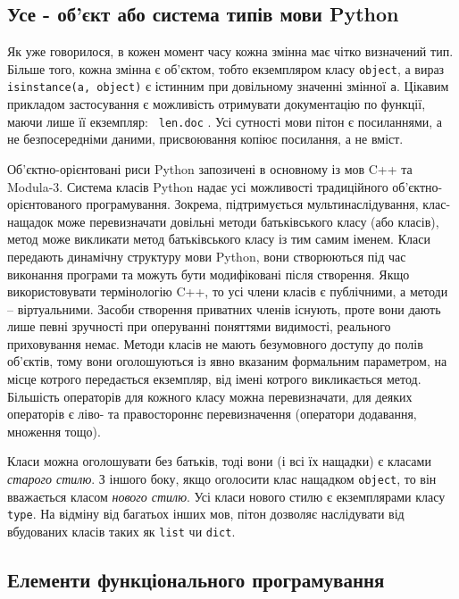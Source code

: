 \documentclass[a4paper, 12pt]{article}
\begin{document}
\subsection{Усе - об'єкт або система типів мови Python}
Як уже говорилося, в кожен момент часу кожна змінна має чітко визначений тип. Більше того,
кожна змінна є об'єктом, тобто екземпляром класу \texttt{object}, а вираз 
\texttt{isinstance(a, object)} є істинним при довільному значенні змінної \texttt{a}. 
Цікавим прикладом застосування є можливість отримувати документацію по функції, маючи
лише її екземпляр: 
\texttt{ len.\textunderscore\textunderscore doc\textunderscore\textunderscore } . 
Усі сутності мови пітон є посиланнями, а не
безпосередніми даними, присвоювання копіює посилання, а не вміст. 

Об'єктно-орієнтовані риси Python запозичені в основному із мов C++ та Modula-3. Система 
класів Python надає усі можливості традиційного об'єктно-орієнтованого програмування.
Зокрема, підтримується мультинаслідування, клас-нащадок може перевизначати довільні методи 
батьківського класу (або класів), метод може викликати метод батьківського класу із тим 
самим іменем. Класи передають динамічну структуру мови Python, вони створюються під час 
виконання програми та можуть бути модифіковані після створення. Якщо використовувати 
термінологію C++, то усі члени класів є публічними, а методи -- віртуальними. Засоби 
створення приватних членів існують, проте вони дають лише певні зручності при оперуванні 
поняттями видимості, реального приховування немає. Методи класів не мають безумовного 
доступу до полів об'єктів, тому вони оголошуються із явно вказаним формальним параметром, 
на місце котрого передається екземпляр, від імені котрого викликається метод. Більшість 
операторів для кожного класу можна перевизначати, для деяких операторів є ліво- та 
правостороннє перевизначення (оператори додавання, множення тощо).

Класи можна оголошувати без батьків, тоді вони (і всі їх нащадки) є класами 
\emph{старого стилю}. З іншого боку, якщо оголосити клас нащадком \texttt{object}, то він 
вважається класом \emph{нового стилю}. Усі класи нового стилю є екземплярами класу 
\texttt{type}.
На відміну від багатьох інших мов, пітон дозволяє наслідувати від вбудованих класів таких 
як \texttt{list} чи \texttt{dict}. 


\subsection{Елементи функціонального програмування}
\end{document}
